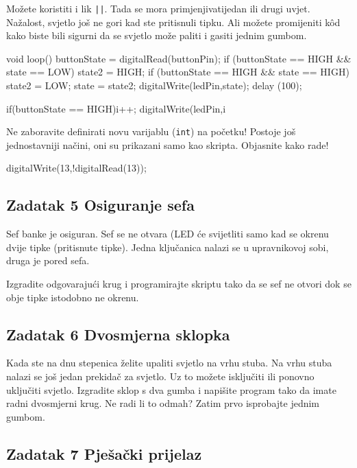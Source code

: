 \documentclass{arduino}
\begin{document}
Možete koristiti i lik \lstinline{||}. Tada se mora primjenjivati ​​jedan ili drugi uvjet. Nažalost, svjetlo još ne gori kad ste pritisnuli tipku. Ali možete promijeniti kôd kako biste bili sigurni da se svjetlo može paliti i gasiti jednim gumbom.

\begin{marginlisting}
void loop() {
  buttonState = digitalRead(buttonPin);
  if (buttonState == HIGH && state == LOW) {
    state2 = HIGH;
    }
  if (buttonState == HIGH && state == HIGH) {
    state2 = LOW;
    }
  state = state2;
  digitalWrite(ledPin,state);
  delay (100);
}
\end{marginlisting}

\begin{marginlisting}
if(buttonState == HIGH){i++;}
digitalWrite(ledPin,i%
\end{marginlisting}
Ne zaboravite definirati novu varijablu (\lstinline{int}) na početku! Postoje još jednostavniji načini, oni su prikazani samo kao skripta. Objasnite kako rade!

\begin{marginlisting}
digitalWrite(13,!digitalRead(13));
\end{marginlisting}

\newpage

\subsection{Zadatak 5 Osiguranje sefa}

Sef banke je osiguran. Sef se ne otvara (LED će svijetliti samo kad se okrenu dvije tipke (pritisnute tipke). Jedna ključanica nalazi se u upravnikovoj sobi, druga je pored sefa.

Izgradite odgovarajući krug i programirajte skriptu tako da se sef ne otvori dok se obje tipke istodobno ne okrenu.

\subsection{Zadatak 6 Dvosmjerna sklopka}

Kada ste na dnu stepenica želite upaliti svjetlo na vrhu stuba. Na vrhu stuba nalazi se još jedan prekidač za svjetlo. Uz to možete isključiti ili ponovno uključiti svjetlo. Izgradite sklop s dva gumba i napišite program tako da imate radni dvosmjerni krug. Ne radi li to odmah? Zatim prvo isprobajte jednim gumbom.

\subsection{Zadatak 7 Pješački prijelaz}
\end{document}
